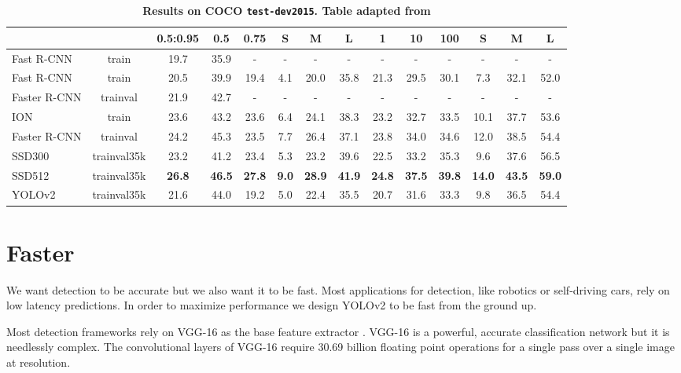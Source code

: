 \documentclass[10pt,twocolumn,letterpaper]{article}
\begin{document}
\begin{table*}
	\centering
	\setlength{\tabcolsep}{1pt}
	\begin{tabular}{l|c|ccc|ccc|ccc|ccc}
        & & 0.5:0.95 & 0.5 & 0.75 & S & M & L & 1 & 10 & 100 & S & M & L\\
        \hline
        Fast R-CNN \cite{fastrcnn} & train & 19.7 & 35.9 & - & - & - & - & - & - & - & - & - & -\\
        Fast R-CNN\cite{bell2015inside} & train & 20.5 & 39.9 & 19.4 & 4.1 & 20.0 & 35.8 & 21.3 & 29.5 & 30.1 & 7.3 & 32.1 & 52.0\\
        Faster R-CNN\cite{ren2015faster} & trainval & 21.9 & 42.7 & - & - & - & - & - & - & - & - & - & -\\
        ION \cite{bell2015inside} & train & 23.6 & 43.2 & 23.6 & 6.4 & 24.1 & 38.3 & 23.2 & 32.7 & 33.5 & 10.1 & 37.7 & 53.6\\
        Faster R-CNN\cite{coco} & trainval & 24.2 & 45.3 & 23.5 & 7.7 & 26.4 & 37.1 & 23.8 & 34.0 & 34.6 & 12.0 & 38.5 & 54.4\\
        SSD300 \cite{ssd} & trainval35k & 23.2 & 41.2 & 23.4 & 5.3 & 23.2 & 39.6 & 22.5 & 33.2 & 35.3 & 9.6 & 37.6 & 56.5\\
        SSD512 \cite{ssd}& trainval35k & \textbf{26.8} & \textbf{46.5} & \textbf{27.8} & \textbf{9.0} & \textbf{28.9} & \textbf{41.9} & \textbf{24.8} & \textbf{37.5} & \textbf{39.8} & \textbf{14.0} & \textbf{43.5} & \textbf{59.0}\\
        \hline
        YOLOv2 \cite{ssd} & trainval35k & 21.6 & 44.0 & 19.2 & 5.0 & 22.4 & 35.5 & 20.7 & 31.6 & 33.3 & 9.8 & 36.5 & 54.4\\
        
    \end{tabular}
    \caption{\textbf{Results on COCO \texttt{test-dev2015}. Table adapted from \cite{ssd}}}
    \label{tab:coco}
\end{table*}


\section{Faster}

We want detection to be accurate but we also want it to be fast. Most applications for detection, like robotics or self-driving cars, rely on low latency predictions. In order to maximize performance we design YOLOv2 to be fast from the ground up.

Most detection frameworks rely on VGG-16 as the base feature extractor \cite{vgg}. VGG-16 is a powerful, accurate classification network but it is needlessly complex. The convolutional layers of VGG-16 require 30.69 billion floating point operations for a single pass over a single image at  resolution.
\end{document}
